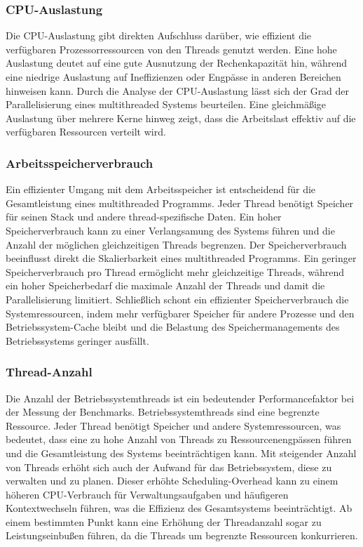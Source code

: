 \documentclass[fontsize=12pt,paper=a4,twoside=semi,parskip=half-,headsepline,headinclude]{scrreprt}
\begin{document}
\subsubsection{CPU-Auslastung}

Die CPU-Auslastung gibt direkten Aufschluss darüber, wie effizient die verfügbaren Prozessorressourcen von den Threads genutzt werden. Eine hohe Auslastung deutet auf eine gute Ausnutzung der Rechenkapazität hin, während eine niedrige Auslastung auf Ineffizienzen oder Engpässe in anderen Bereichen hinweisen kann. Durch die Analyse der CPU-Auslastung lässt sich der Grad der Parallelisierung eines multithreaded Systems beurteilen. Eine gleichmäßige Auslastung über mehrere Kerne hinweg zeigt, dass die Arbeitslast effektiv auf die verfügbaren Ressourcen verteilt wird.

\subsubsection{Arbeitsspeicherverbrauch}

Ein effizienter Umgang mit dem Arbeitsspeicher ist entscheidend für die Gesamtleistung eines multithreaded Programms. Jeder Thread benötigt Speicher für seinen Stack und andere thread-spezifische Daten. Ein hoher Speicherverbrauch kann zu einer Verlangsamung des Systems führen und die Anzahl der möglichen gleichzeitigen Threads begrenzen. Der Speicherverbrauch beeinflusst direkt die Skalierbarkeit eines multithreaded Programms. Ein geringer Speicherverbrauch pro Thread ermöglicht mehr gleichzeitige Threads, während ein hoher Speicherbedarf die maximale Anzahl der Threads und damit die Parallelisierung limitiert. Schließlich schont ein effizienter Speicherverbrauch die Systemressourcen, indem mehr verfügbarer Speicher für andere Prozesse und den Betriebssystem-Cache bleibt und die Belastung des Speichermanagements des Betriebssystems geringer ausfällt.

\subsubsection{Thread-Anzahl}

Die Anzahl der Betriebssystemthreads ist ein bedeutender Performancefaktor bei der Messung der Benchmarks. Betriebssystemthreads sind eine begrenzte Ressource. Jeder Thread benötigt Speicher und andere Systemressourcen, was bedeutet, dass eine zu hohe Anzahl von Threads zu Ressourcenengpässen führen und die Gesamtleistung des Systems beeinträchtigen kann. Mit steigender Anzahl von Threads erhöht sich auch der Aufwand für das Betriebssystem, diese zu verwalten und zu planen. Dieser erhöhte Scheduling-Overhead kann zu einem höheren CPU-Verbrauch für Verwaltungsaufgaben und häufigeren Kontextwechseln führen, was die Effizienz des Gesamtsystems beeinträchtigt. Ab einem bestimmten Punkt kann eine Erhöhung der Threadanzahl sogar zu Leistungseinbußen führen, da die Threads um begrenzte Ressourcen konkurrieren.
\end{document}

